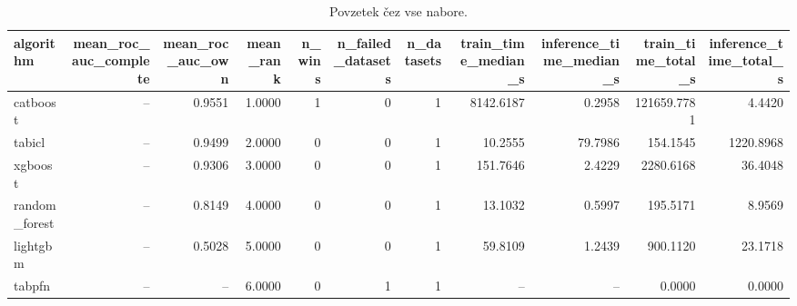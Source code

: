 \begin{table}[htbp]
\centering
\caption{Povzetek čez vse nabore.}
\label{tab:overall}
\begin{tabular}{lrrrrrrrrrr}
\hline
algorithm & mean\_roc\_auc\_complete & mean\_roc\_auc\_own & mean\_rank & n\_wins & n\_failed\_datasets & n\_datasets & train\_time\_median\_s & inference\_time\_median\_s & train\_time\_total\_s & inference\_time\_total\_s \\
\hline
catboost & -- & 0.9551 & 1.0000 & 1 & 0 & 1 & 8142.6187 & 0.2958 & 121659.7781 & 4.4420 \\
tabicl & -- & 0.9499 & 2.0000 & 0 & 0 & 1 & 10.2555 & 79.7986 & 154.1545 & 1220.8968 \\
xgboost & -- & 0.9306 & 3.0000 & 0 & 0 & 1 & 151.7646 & 2.4229 & 2280.6168 & 36.4048 \\
random\_forest & -- & 0.8149 & 4.0000 & 0 & 0 & 1 & 13.1032 & 0.5997 & 195.5171 & 8.9569 \\
lightgbm & -- & 0.5028 & 5.0000 & 0 & 0 & 1 & 59.8109 & 1.2439 & 900.1120 & 23.1718 \\
tabpfn & -- & -- & 6.0000 & 0 & 1 & 1 & -- & -- & 0.0000 & 0.0000 \\
\hline
\end{tabular}
\end{table}
